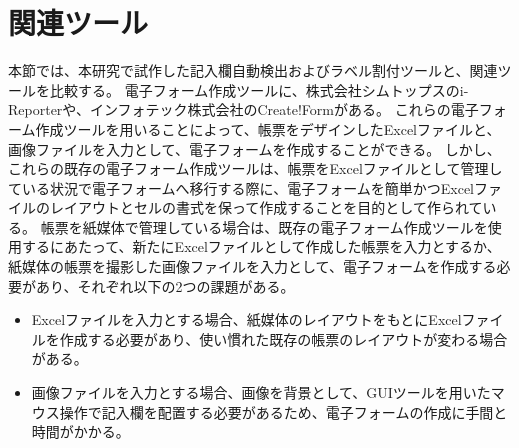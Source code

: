 






\section{関連ツール}\label{sec:relation_tools}
本節では、本研究で試作した記入欄自動検出およびラベル割付ツールと、関連ツールを比較する。
電子フォーム作成ツールに、株式会社シムトップスのi-Reporter\cite{i-Reporter}や、インフォテック株式会社のCreate!Form\cite{Create!Form}がある。
これらの電子フォーム作成ツールを用いることによって、帳票をデザインしたExcelファイルと、画像ファイルを入力として、電子フォームを作成することができる。
しかし、これらの既存の電子フォーム作成ツールは、帳票をExcelファイルとして管理している状況で電子フォームへ移行する際に、電子フォームを簡単かつExcelファイルのレイアウトとセルの書式を保って作成することを目的として作られている。
帳票を紙媒体で管理している場合は、既存の電子フォーム作成ツールを使用するにあたって、新たにExcelファイルとして作成した帳票を入力とするか、紙媒体の帳票を撮影した画像ファイルを入力として、電子フォームを作成する必要があり、それぞれ以下の2つの課題がある。

\begin{itemize}
    \item Excelファイルを入力とする場合、紙媒体のレイアウトをもとにExcelファイルを作成する必要があり、使い慣れた既存の帳票のレイアウトが変わる場合がある。
    \item 画像ファイルを入力とする場合、画像を背景として、GUIツールを用いたマウス操作で記入欄を配置する必要があるため、電子フォームの作成に手間と時間がかかる。
  \end{itemize}

